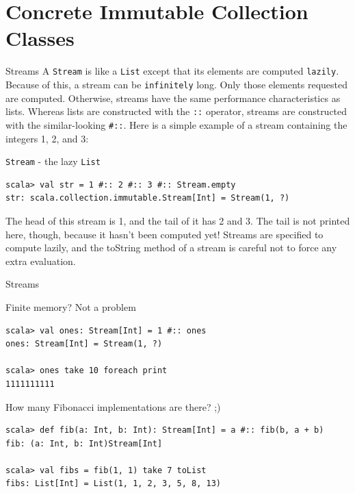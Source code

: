 \section{Concrete Immutable Collection Classes}
\begin{frame}[fragile]{Streams}
A \lstinline!Stream! is like a \lstinline!List! except that its elements are
computed \lstinline!lazily!. Because of this, a stream can be
\lstinline!infinitely! long. Only those elements requested are computed.
Otherwise, streams have the same performance characteristics as lists.
\newline
\newline
Whereas lists are constructed with the \lstinline!::! operator, streams are
constructed with the similar-looking \lstinline!#::!. Here is a simple example
of a stream containing the integers 1, 2, and 3:\\
\begin{exampleblock}{\lstinline!Stream! - the lazy \lstinline!List!}
\begin{lstlisting}
scala> val str = 1 #:: 2 #:: 3 #:: Stream.empty
str: scala.collection.immutable.Stream[Int] = Stream(1, ?)
\end{lstlisting}
\end{exampleblock}
The head of this stream is 1, and the tail of it has 2 and 3. The tail is not
printed here, though, because it hasn't been computed yet! Streams are specified
to compute lazily, and the toString method of a stream is careful not to force
any extra evaluation.
\end{frame}

\begin{frame}[fragile]{Streams}
\begin{exampleblock}{Finite memory? Not a problem}
\begin{lstlisting}
scala> val ones: Stream[Int] = 1 #:: ones
ones: Stream[Int] = Stream(1, ?)

scala> ones take 10 foreach print
1111111111
\end{lstlisting}
\end{exampleblock}
\pause
\begin{exampleblock}{How many Fibonacci implementations are there? ;)}
\begin{lstlisting}
scala> def fib(a: Int, b: Int): Stream[Int] = a #:: fib(b, a + b)
fib: (a: Int, b: Int)Stream[Int]

scala> val fibs = fib(1, 1) take 7 toList
fibs: List[Int] = List(1, 1, 2, 3, 5, 8, 13)
\end{lstlisting}
\end{exampleblock}
\end{frame}

